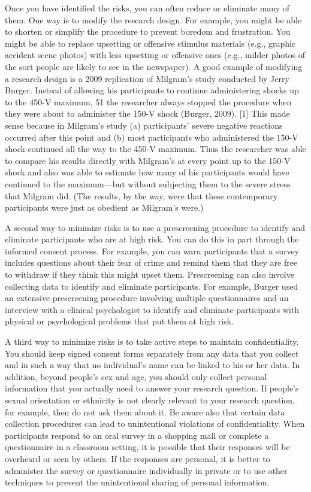 Once you have identified the risks, you can often reduce or eliminate many of them. One way is to modify the research design. For example, you might be able to shorten or simplify the procedure to prevent boredom and frustration. You might be able to replace upsetting or offensive stimulus materials (e.g., graphic accident scene photos) with less upsetting or offensive ones (e.g., milder photos of the sort people are likely to see in the newspaper). A good example of modifying a research design is a 2009 replication of Milgram's study conducted by Jerry Burger. Instead of allowing his participants to continue administering shocks up to the 450-V maximum,
51
the researcher always stopped the procedure when they were about to administer the 150-V shock (Burger, 2009). [1] This made sense because in Milgram's study (a) participants' severe negative reactions occurred after this point and (b) most participants who administered the 150-V shock continued all the way to the 450-V maximum. Thus the researcher was able to compare his results directly with Milgram's at every point up to the 150-V shock and also was able to estimate how many of his participants would have continued to the maximum---but without subjecting them to the severe stress that Milgram did. (The results, by the way, were that these contemporary participants were just as obedient as Milgram's were.)

A second way to minimize risks is to use a prescreening procedure to identify and eliminate participants who are at high risk. You can do this in part through the informed consent process. For example, you can warn participants that a survey includes questions about their fear of crime and remind them that they are free to withdraw if they think this might upset them. Prescreening can also involve collecting data to identify and eliminate participants. For example, Burger used an extensive prescreening procedure involving multiple questionnaires and an interview with a clinical psychologist to identify and eliminate participants with physical or psychological problems that put them at high risk.

A third way to minimize risks is to take active steps to maintain confidentiality. You should keep signed consent forms separately from any data that you collect and in such a way that no individual's name can be linked to his or her data. In addition, beyond people's sex and age, you should only collect personal information that you actually need to answer your research question. If people's sexual orientation or ethnicity is not clearly relevant to your research question, for example, then do not ask them about it. Be aware also that certain data collection procedures can lead to unintentional violations of confidentiality. When participants respond to an oral survey in a shopping mall or complete a questionnaire in a classroom setting, it is possible that their responses will be overheard or seen by others. If the responses are personal, it is better to administer the survey or questionnaire individually in private or to use other techniques to prevent the unintentional sharing of personal information.

